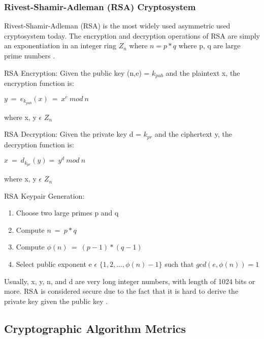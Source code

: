 \subsubsection{Rivest-Shamir-Adleman (RSA) Cryptosystem}

Rivest-Shamir-Adleman (RSA) is the most widely used asymmetric used cryptosystem today. The encryption and decryption operations of RSA are simply an exponentiation in an integer ring ${Z_n}$ where ${n = p*q}$ where p, q are large prime numbers \cite{153}.

RSA Encryption: Given the public key (n,e) = ${k_{pub}}$ and the plaintext x, the encryption function is:
\begin{center}
    ${y\ =\ e_{k_{pub}} (x)\ =\ x^e\ mod\ n}$
\end{center}
where x, y ${\epsilon}$ ${Z_n}$

RSA Decryption: Given the private key d = ${k_{pr}}$ and the ciphertext y, the decryption function is:
\begin{center}
    ${x\ =\ d_{k_{pr}} (y) =\ y^d\ mod\ n}$
\end{center}
where x, y ${\epsilon}$ ${Z_n}$ \

RSA Keypair Generation: 
\begin{enumerate}
    \item Choose two large primes p and q
    \item Compute ${n\ =\ p*q}$
    \item Compute ${\phi(n)\ =\ (p-1)*(q-1)}$
    \item Select public exponent e ${\epsilon}$ ${\{1, 2, ..., \phi(n)-1}\}$ such that ${gcd(e,\phi(n))=1}$
\end{enumerate}

Usually, x, y, n, and d are very long integer numbers, with length of 1024 bits or more. RSA is considered secure due to the fact that it is hard to derive the private key given the public key \cite{153}.

\subsection{Cryptographic Algorithm Metrics}

